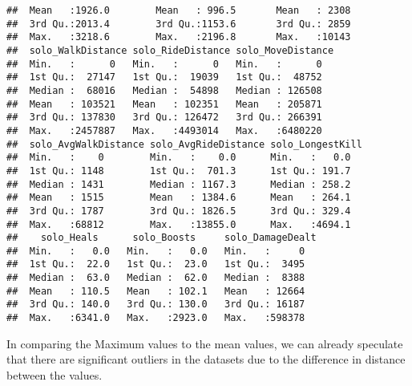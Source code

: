 \documentclass[]{article}
\begin{document}
\begin{verbatim}
##  Mean   :1926.0        Mean   : 996.5       Mean   : 2308  
##  3rd Qu.:2013.4        3rd Qu.:1153.6       3rd Qu.: 2859  
##  Max.   :3218.6        Max.   :2196.8       Max.   :10143  
##  solo_WalkDistance solo_RideDistance solo_MoveDistance
##  Min.   :      0   Min.   :      0   Min.   :      0  
##  1st Qu.:  27147   1st Qu.:  19039   1st Qu.:  48752  
##  Median :  68016   Median :  54898   Median : 126508  
##  Mean   : 103521   Mean   : 102351   Mean   : 205871  
##  3rd Qu.: 137830   3rd Qu.: 126472   3rd Qu.: 266391  
##  Max.   :2457887   Max.   :4493014   Max.   :6480220  
##  solo_AvgWalkDistance solo_AvgRideDistance solo_LongestKill
##  Min.   :    0        Min.   :    0.0      Min.   :   0.0  
##  1st Qu.: 1148        1st Qu.:  701.3      1st Qu.: 191.7  
##  Median : 1431        Median : 1167.3      Median : 258.2  
##  Mean   : 1515        Mean   : 1384.6      Mean   : 264.1  
##  3rd Qu.: 1787        3rd Qu.: 1826.5      3rd Qu.: 329.4  
##  Max.   :68812        Max.   :13855.0      Max.   :4694.1  
##    solo_Heals      solo_Boosts     solo_DamageDealt
##  Min.   :   0.0   Min.   :   0.0   Min.   :     0  
##  1st Qu.:  22.0   1st Qu.:  23.0   1st Qu.:  3495  
##  Median :  63.0   Median :  62.0   Median :  8388  
##  Mean   : 110.5   Mean   : 102.1   Mean   : 12664  
##  3rd Qu.: 140.0   3rd Qu.: 130.0   3rd Qu.: 16187  
##  Max.   :6341.0   Max.   :2923.0   Max.   :598378
\end{verbatim}

In comparing the Maximum values to the mean values, we can already
speculate that there are significant outliers in the datasets due to the
difference in distance between the values.
\end{document}
